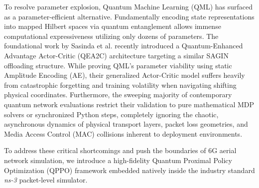 \documentclass[conference]{IEEEtran}
\begin{document}
To resolve parameter explosion, Quantum Machine Learning (QML) has surfaced as a parameter-efficient alternative. Fundamentally encoding state representations into mapped Hilbert spaces via quantum entanglement allows immense computational expressiveness utilizing only dozens of parameters. The foundational work by Sasinda et al. \cite{sasinda2025} recently introduced a Quantum-Enhanced Advantage Actor-Critic (QEA2C) architecture targeting a similar SAGIN offloading structure. While proving QML's parameter viability using static Amplitude Encoding (AE), their generalized Actor-Critic model suffers heavily from catastrophic forgetting and training volatility when navigating shifting physical coordinates. Furthermore, the sweeping majority of contemporary quantum network evaluations restrict their validation to pure mathematical MDP solvers or synchronized Python steps, completely ignoring the chaotic, asynchronous dynamics of physical transport layers, packet loss geometries, and Media Access Control (MAC) collisions inherent to deployment environments.

To address these critical shortcomings and push the boundaries of 6G aerial network simulation, we introduce a high-fidelity Quantum Proximal Policy Optimization (QPPO) framework embedded natively inside the industry standard \textit{ns-3} packet-level simulator.
\end{document}
